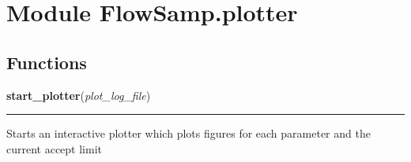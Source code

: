 %
%
%


\section{Module FlowSamp.plotter}

    \label{FlowSamp:plotter}


  \subsection{Functions}

    \label{FlowSamp:plotter:start_plotter}

    \vspace{0.5ex}

\hspace{.8\funcindent}\begin{boxedminipage}{\funcwidth}

    \raggedright \textbf{start\_plotter}(\textit{plot\_log\_file})

    \vspace{-1.5ex}

    \rule{\textwidth}{0.5\fboxrule}
\setlength{\parskip}{2ex}
    Starts an interactive plotter which plots figures for each parameter 
    and the current accept limit

\setlength{\parskip}{1ex}
    \end{boxedminipage}



